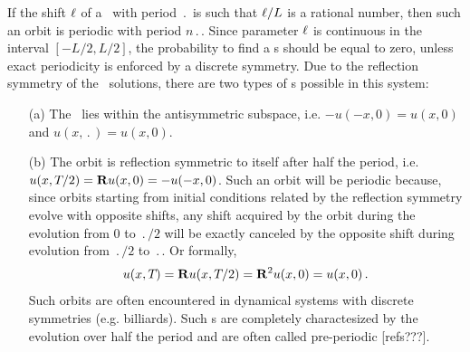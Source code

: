 If the shift $\ell$ of a \rpo\ with period $\period{}$ is such
that $\ell /L$ is a rational number, then such an orbit is
periodic with period $n\period{}$.  Since parameter
$\ell$ is continuous in the interval $[-L/2, L/2]$,
the probability to find a \po s should be equal to zero,
unless exact periodicity is enforced by a discrete symmetry.
Due to the reflection symmetry of the \KS\ solutions, there are
two types of \po s possible in this system:
\begin{itemize}
\item[(a)] The \po\ lies within the antisymmetric subspace, i.e.
$-u(-x,0) = u(x,0)$ and $u(x,\period{}) = u(x,0)$.
\item[(b)] The orbit is reflection symmetric to itself after half
the period, i.e. $u(x,{T_{}}/2) = {\bf R} u(x,0) = -u(-x,0)$.
Such an orbit will be periodic because, since orbits starting from
initial conditions related by the reflection symmetry evolve with
opposite shifts, any shift acquired by the orbit during the evolution
from $0$ to $\period{}/2$ will be exactly canceled by the opposite
shift during evolution from $\period{}/2$ to $\period{}$.  Or formally,
\[ u(x,{T_{}}) = {\bf R} u(x,{T_{}}/2) =
   {\bf R}^2 u(x,0) = u(x,0)\,. \]
Such orbits are often encountered in dynamical systems with discrete
symmetries (e.g. billiards).  Such \po s are completely charactesized
by the evolution over half the period and are often called
pre-periodic [refs???].
\end{itemize}
